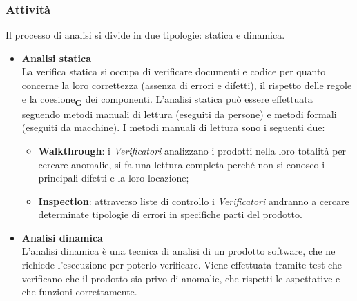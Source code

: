 \subsubsection{Attività}
Il processo di analisi si divide in due tipologie: statica e dinamica.
\begin{itemize}
    \item \textbf{Analisi statica}\\
          La verifica statica si occupa di verificare documenti e codice per quanto concerne la loro correttezza (assenza di errori e difetti), il rispetto delle regole e la coesione\textsubscript{\textbf{G}} dei componenti. L'analisi statica può essere effettuata seguendo metodi manuali di lettura (eseguiti da persone) e metodi formali (eseguiti da macchine). I metodi manuali di lettura sono i seguenti due:
          \begin{itemize}
              \item \textbf{Walkthrough}: i \textit{Verificatori} analizzano i prodotti nella loro totalità per cercare anomalie, si fa una lettura completa perché non si conosco i principali difetti e la loro locazione;
              \item \textbf{Inspection}: attraverso liste di controllo i \textit{Verificatori} andranno a cercare determinate tipologie di errori in specifiche parti del prodotto.
          \end{itemize}
    \item \textbf{Analisi dinamica}\\
          L'analisi dinamica è una tecnica di analisi di un prodotto software, che ne richiede l'esecuzione per poterlo verificare. Viene effettuata tramite test che verificano che il prodotto sia privo di anomalie, che rispetti le aspettative e che funzioni correttamente.
\end{itemize}

